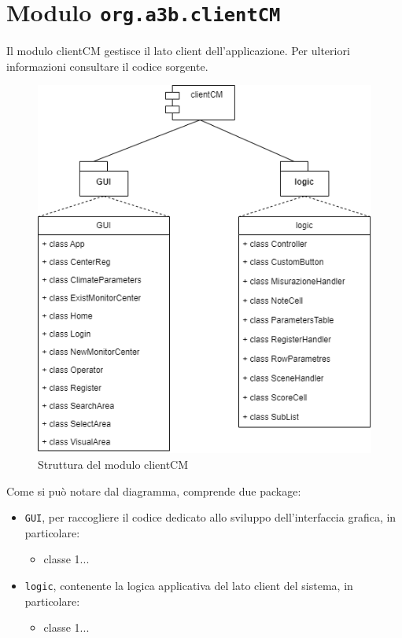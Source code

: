 \chapter{Modulo \texttt{org.a3b.clientCM}}
\label{ch:client}
Il modulo clientCM gestisce il lato client dell'applicazione. Per ulteriori informazioni consultare il codice sorgente.

\begin{figure}[h]
	\centering
	\caption{Struttura del modulo clientCM}
	\label{fig:clientcm}
	\includegraphics[width=0.8\linewidth]{../../fig/img/tecnico/clientCM.drawio}
\end{figure}

\pagebreak
Come si può notare dal diagramma, comprende due package:
\begin{itemize}
	\item \texttt{GUI}, per raccogliere il codice dedicato allo sviluppo dell'interfaccia grafica, in particolare:
	\begin{itemize}
		\item classe 1...
	\end{itemize}
	\item \texttt{logic}, contenente la logica applicativa del lato client del sistema, in particolare:
	\begin{itemize}
		\item classe 1...
	\end{itemize}
\end{itemize}

